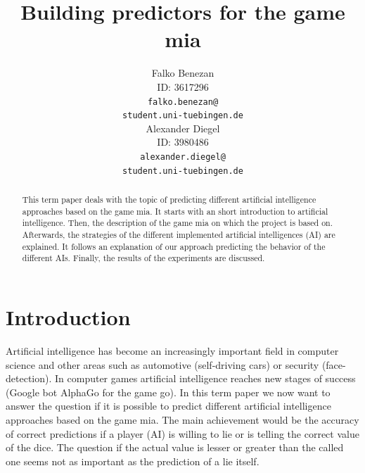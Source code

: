 \documentclass[11pt]{article}
\title{Building predictors for the game mia}
\author{Falko Benezan \\
  ID: 3617296\\
  {\tt falko.benezan@}\\
  {\tt student.uni-tuebingen.de} \\\And
  Alexander Diegel \\
	ID: 3980486 \\
  {\tt alexander.diegel@}\\
  {\tt student.uni-tuebingen.de} \\}
\date{}
\begin{document}
\maketitle
\begin{abstract}
  This term paper deals with the topic of predicting different artificial intelligence approaches based on the game mia. It starts with an short introduction to artificial intelligence. Then, the description of the game mia on which the project is based on. Afterwards, the strategies of the different implemented artificial intelligences (AI) are explained. It follows an explanation of our approach predicting the behavior of the different AIs. Finally, the results of the experiments are discussed.
\end{abstract}


\section{Introduction}
Artificial intelligence has become an increasingly important field in computer science and other areas such as automotive (self-driving cars) or security (face-detection).
In computer games artificial intelligence reaches new stages of success (Google bot AlphaGo for the game go). In this term paper we now want to answer the question if it is possible to predict different artificial intelligence approaches based on the game mia. The main achievement would be the accuracy of correct predictions if a player (AI) is willing to lie or is telling the correct value of the dice. The question if the actual value is lesser or greater than the called one seems not as important as the prediction of a lie itself. 
\end{document}
